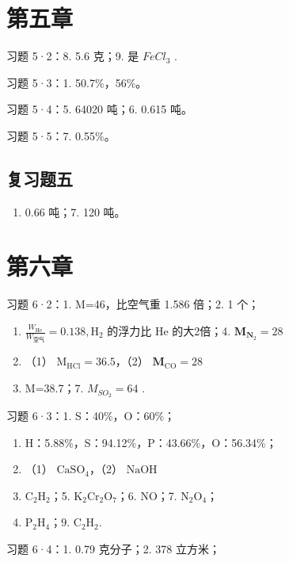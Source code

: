 \section{第五章}

习题 5·2：8. 5.6 克；9. 是 \(FeCl_{3}\) .

习题 5·3：1. 50.7\%，56\%。

习题 5·4：5. 64020 吨；6. 0.615 吨。

习题 5·5：7. 0.55\%。

\subsection{复习题五}

\begin{enumerate}[start=6]
\item
  0.66 吨；7. 120 吨。
\end{enumerate}

\section{第六章}

习题 6·2：1. M=46，比空气重 1.586 倍；2. 1 个；

\begin{enumerate}[start=3]
\item
  \(\frac{W_{\mathrm{He}}}{W_{\mathrm{空气}}} = 0.138, \mathrm{H}_{2}\)
  的浮力比 \(\mathrm{He}\) 的大2倍；4.
  \(\mathbf{M}_{\mathbf{N}_2} = 28\)
\item
  （1） \(\mathrm{M_{HCl}} = 36.5\)，（2）
  \(\mathbf{M}_{\mathrm{CO}} = 28\)
\item
  M=38.7；7. \(M_{SO_{2}}=64\) .
\end{enumerate}

习题 6·3：1. S：40\%，O：60\%；

\begin{enumerate}[start=2]
\item
  H：5.88\%，S：94.12\%，P：43.66\%，O：56.34\%；
\item
  （1） \(\mathrm{CaSO}_4\)，（2） \(\mathrm{NaOH}\)
\item
  \(\mathrm{C_2H_2}\)；5. \(\mathrm{K}_2\mathrm{Cr}_2\mathrm{O}_7\)；6.
  NO；7. \(\mathrm{N}_2\mathrm{O}_4\)；
\item
  \(\mathrm{P}_{2} \mathrm{H}_{4}\)；9.
  \(\mathrm{C}_{2} \mathrm{H}_{2}\).
\end{enumerate}

习题 6·4：1. 0.79 克分子；2. 378 立方米；

